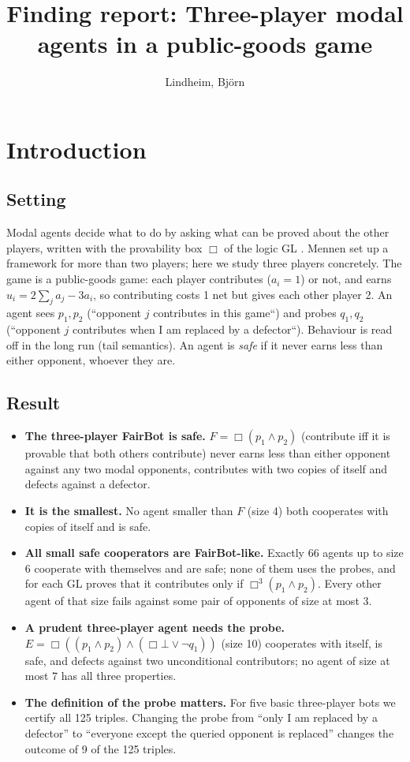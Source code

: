 \documentclass{article}
\title{Finding report: Three-player modal agents in a public-goods game}
\author{Lindheim, Björn}
\date{}
\begin{document}
\maketitle
\section{Introduction}
\label{sec:three-player-modal-agents}

\subsection*{Setting}

Modal agents decide what to do by asking what can be proved about the other players, written with
the provability box $\Box$ of the logic GL \cite{barasz2014robust}. Mennen \cite{mennen2017modal} set up a
framework for more than two players; here we study three players concretely. The game is a
public-goods game: each player contributes ($a_i = 1$) or not, and earns
$u_i = 2\sum_j a_j - 3a_i$, so contributing costs 1 net but gives each other player 2. An agent sees
$p_1, p_2$ (``opponent $j$ contributes in this game``) and probes $q_1, q_2$ (``opponent $j$
contributes when I am replaced by a defector``). Behaviour is read off in the long run (tail
semantics). An agent is \emph{safe} if it never earns less than either opponent, whoever they are.

\subsection*{Result}

\begin{itemize}
\item \textbf{The three-player FairBot is safe.} $F = \Box(p_1 \wedge p_2)$ (contribute iff it is provable that both others contribute) never earns less than either opponent against any two modal opponents, contributes with two copies of itself and defects against a defector.
\item \textbf{It is the smallest.} No agent smaller than $F$ (size 4) both cooperates with copies of itself and is safe.
\item \textbf{All small safe cooperators are FairBot-like.} Exactly 66 agents up to size 6 cooperate with themselves and are safe; none of them uses the probes, and for each GL proves that it contributes only if $\Box^3(p_1 \wedge p_2)$. Every other agent of that size fails against some pair of opponents of size at most 3.
\item \textbf{A prudent three-player agent needs the probe.} $E = \Box((p_1 \wedge p_2) \wedge (\Box\bot \vee \neg q_1))$ (size 10) cooperates with itself, is safe, and defects against two unconditional contributors; no agent of size at most 7 has all three properties.
\item \textbf{The definition of the probe matters.} For five basic three-player bots we certify all 125 triples. Changing the probe from ``only I am replaced by a defector'' to ``everyone except the queried opponent is replaced'' changes the outcome of 9 of the 125 triples.
\end{itemize}
\end{document}
